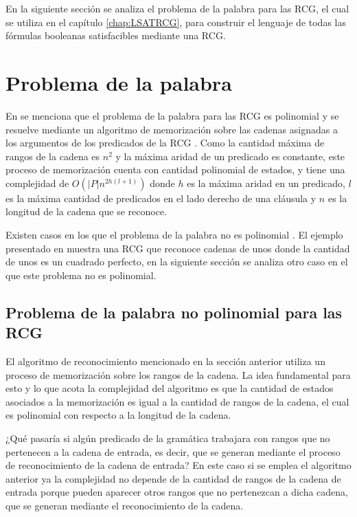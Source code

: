 \documentclass[12pt]{article}
\begin{document}
En la siguiente sección se analiza el problema de la palabra para las RCG, el cual se utiliza en el
capítulo \ref{chap:LSATRCG}, para construir el lenguaje de todas las fórmulas booleanas satisfacibles mediante
una RCG.

\section{Problema de la palabra}

En \cite{mainRCGBib} se menciona que el problema de la palabra para las RCG es polinomial y se resuelve mediante un
algoritmo de memorización sobre las cadenas asignadas a los argumentos de
los predicados de la RCG \cite{mainRCGBib}.  Como la cantidad máxima de rangos de la cadena es $n^2$ y la máxima
aridad de un predicado es constante, este proceso de memorización cuenta con cantidad polinomial de estados,
y tiene una complejidad de $O(|P|n^{2h(l+1)})$ donde $h$ es la máxima aridad en un predicado, $l$ es la máxima
cantidad de predicados en el lado derecho de una cláusula y $n$ es la longitud de la cadena que se reconoce.

Existen casos en los que el problema de la palabra no es polinomial \cite{propertiesRCGBib}.
El ejemplo presentado en \cite{propertiesRCGBib} muestra una RCG que reconoce cadenas de unos donde la cantidad de unos es un cuadrado perfecto,
en la siguiente sección se analiza otro caso en el que este problema no es polinomial.

\subsection{Problema de la palabra no polinomial para las RCG}

El algoritmo de reconocimiento mencionado en la sección anterior utiliza un proceso de memorización sobre los rangos de la cadena.
La idea fundamental para esto y lo que acota la complejidad del algoritmo es que la cantidad de estados
asociados a la memorización es igual a la cantidad de rangos de la cadena, el cual es polinomial con respecto a la longitud de la cadena.

¿Qué pasaría si algún predicado de la gramática trabajara con rangos que no pertenecen a la cadena de entrada, es decir,
que se generan mediante el proceso de reconocimiento de la cadena de entrada? En este caso si se emplea el algoritmo anterior ya la complejidad
no depende de la cantidad de rangos de la cadena de entrada porque pueden aparecer otros rangos que no pertenezcan a dicha cadena, que se generan mediante el reconocimiento de la cadena.
\end{document}
